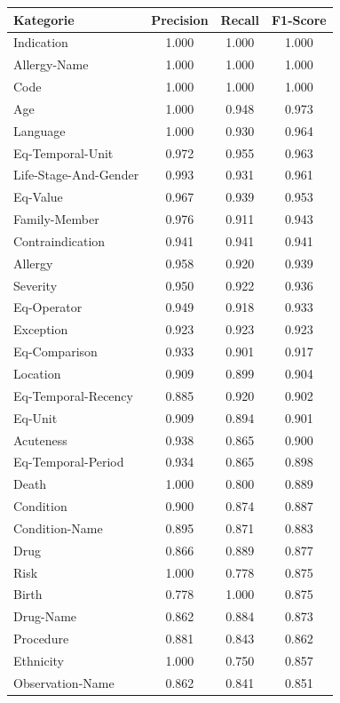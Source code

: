 \begin{table}[htbp]
\centering
\begin{tabular}{p{5cm}ccc}
\toprule
\textbf{Kategorie} & \textbf{Precision} & \textbf{Recall} & \textbf{F1-Score} \\
\midrule
Indication & 1.000 & 1.000 & 1.000 \\
Allergy-Name & 1.000 & 1.000 & 1.000 \\
Code & 1.000 & 1.000 & 1.000 \\
Age & 1.000 & 0.948 & 0.973 \\
Language & 1.000 & 0.930 & 0.964 \\
Eq-Temporal-Unit & 0.972 & 0.955 & 0.963 \\
Life-Stage-And-Gender & 0.993 & 0.931 & 0.961 \\
Eq-Value & 0.967 & 0.939 & 0.953 \\
Family-Member & 0.976 & 0.911 & 0.943 \\
Contraindication & 0.941 & 0.941 & 0.941 \\
Allergy & 0.958 & 0.920 & 0.939 \\
Severity & 0.950 & 0.922 & 0.936 \\
Eq-Operator & 0.949 & 0.918 & 0.933 \\
Exception & 0.923 & 0.923 & 0.923 \\
Eq-Comparison & 0.933 & 0.901 & 0.917 \\
Location & 0.909 & 0.899 & 0.904 \\
Eq-Temporal-Recency & 0.885 & 0.920 & 0.902 \\
Eq-Unit & 0.909 & 0.894 & 0.901 \\
Acuteness & 0.938 & 0.865 & 0.900 \\
Eq-Temporal-Period & 0.934 & 0.865 & 0.898 \\
Death & 1.000 & 0.800 & 0.889 \\
Condition & 0.900 & 0.874 & 0.887 \\
Condition-Name & 0.895 & 0.871 & 0.883 \\
Drug & 0.866 & 0.889 & 0.877 \\
Risk & 1.000 & 0.778 & 0.875 \\
Birth & 0.778 & 1.000 & 0.875 \\
Drug-Name & 0.862 & 0.884 & 0.873 \\
Procedure & 0.881 & 0.843 & 0.862 \\
Ethnicity & 1.000 & 0.750 & 0.857 \\
Observation-Name & 0.862 & 0.841 & 0.851 \\

\end{tabular}
\end{table}
